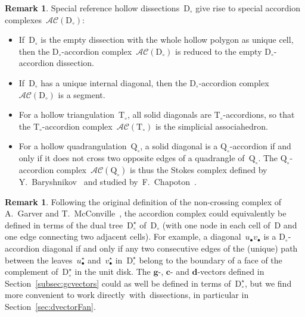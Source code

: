 \documentclass{amsart}
\theoremstyle{definition}
\newtheorem{remark}[theorem]{Remark}
\renewcommand{\b}[1]{\mathbf{#1}} %
\newcommand{\accordionComplex}{\mathcal{AC}} %
\newcommand{\triangulation}{\mathrm{T}} %
\newcommand{\quadrangulation}{\mathrm{Q}} %
\newcommand{\dissection}{\mathrm{D}} %
\begin{document}
\begin{remark}
\label{rem:specialReferenceDissections}
Special reference hollow dissections~$\dissection_\circ$ give rise to special accordion complexes~$\accordionComplex(\dissection_\circ)$:
\begin{itemize}
\item If~$\dissection_\circ$ is the empty dissection with the whole hollow polygon as unique cell, then the \mbox{$\dissection_\circ$-accor}\-dion complex~$\accordionComplex(\dissection_\circ)$ is reduced to the empty $\dissection_\circ$-accordion dissection.
\item If~$\dissection_\circ$ has a unique internal diagonal, then the $\dissection_\circ$-accordion complex~$\accordionComplex(\dissection_\circ)$ is a segment.
\item For a hollow triangulation~$\triangulation_\circ$, all solid diagonals are $\triangulation_\circ$-accordions, so that the \mbox{$\triangulation_\circ$-accor}\-dion complex~$\accordionComplex(\triangulation_\circ)$ is the simplicial associahedron.
\item For a hollow quadrangulation~$\quadrangulation_\circ$, a solid diagonal is a $\quadrangulation_\circ$-accordion if and only if it does not cross two opposite edges of a quadrangle of~$\quadrangulation_\circ$. The $\quadrangulation_\circ$-accordion complex~$\accordionComplex(\quadrangulation_\circ)$ is thus the Stokes complex defined by Y.~Baryshnikov~\cite{Baryshnikov} and studied \mbox{by F.~Chapoton~\cite{Chapoton-quadrangulations}}.
\end{itemize}
\end{remark}

\begin{remark}
Following the original definition of the non-crossing complex of A.~Garver and T.~McConville~\cite{GarverMcConville}, the accordion complex could equivalently be defined in terms of the dual tree~$\dissection_\circ^\star$ of~$\dissection_\circ$ (with one node in each cell of~$\dissection$ and one edge connecting two adjacent cells). For example, a diagonal~$u_\bullet v_\bullet$ is a $\dissection_\circ$-accordion diagonal if and only if any two consecutive edges of the (unique) path between the leaves~$u_\bullet^\star$ and~$v_\bullet^\star$ in~$\dissection_\circ^\star$ belong to the boundary of a face of the complement of~$\dissection_\circ^\star$ in the unit disk. The $\b{g}$-, $\b{c}$- and $\b{d}$-vectors defined in Section~\ref{subsec:gcvectors} could as well be defined in terms of~$\dissection_\circ^\star$, but we find more convenient to work directly~with~dissections, in particular in Section~\ref{sec:dvectorFan}.
\end{remark}
\end{document}
